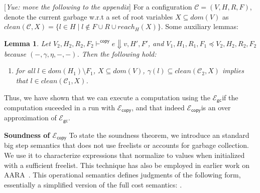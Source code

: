 \documentclass{easychair}
\newcommand{\ms}[1]{\ensuremath{\mathsf{#1}}}
\newcommand{\yue}[1]{{\color{blue} [\emph{Yue: #1}]}}
\newcommand{\gcSem}{\ensuremath{\mathcal{E}_{\ms{gc}}}}
\newcommand{\copySem}{\ensuremath{\mathcal{E}_{\ms{copy}}}}
\newtheorem{lemma}[theorem]{Lemma}
\theoremstyle{definition}
\begin{document}
\yue{move the following to the appendix}
For a configuration $\mathcal{C} = (V,H,R,F)$, denote the current garbage w.r.t a set of root variables 
$X \subseteq dom(V)$ 
as $clean(\mathcal{C},X) = \{l \in H \mid l \notin F \cup R \cup reach_H(X)\}$. Some auxiliary lemmas: 

\begin{lemma}\label{itm:aux}
Let $V_2,H_2,R_2,F_2 \vdash^{\mathsf{copy}} e \Downarrow v,H',F'$, and 
$V_1,H_1,R_1,F_1 \preceq V_2,H_2,R_2,F_2$ because $(-,\gamma,\eta,-,-)$. Then the following hold:
\begin{enumerate}
\item for all $l \in dom(H_1) \setminus F_1$, 
$X \subseteq dom(V)$, $\gamma(l) \subseteq clean(\mathcal{C}_2,X)$ implies that 
$l \in clean(\mathcal{C}_1,X)$.
\end{enumerate}
\end{lemma}

Thus, we have shown that we can execute a computation using the 
\gcSem if the computation suceeded in a run with \copySem, and that indeed 
\copySem is an over approximation of \gcSem.

\textbf{Soundness of \copySem}
\label{sect:soundcopy}
To state the soundness theorem,
we introduce an standard big step semantics
that does not use freelists or accounts for garbage collection. We use
it to characterize expressions that normalize to values when initialized with a sufficient 
freelist.  This technique has also be  employed in earlier work on AARA~\cite{Hofmann:2003:SPH:604131.604148}.
This operational semantics defines 
judgments of the following form, essentially a simplified version of the full cost semantics:
.
\end{document}
